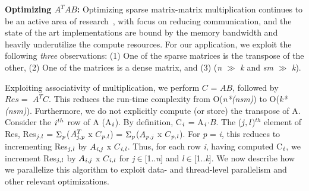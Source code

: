 \vspace*{0.1in} 
{\bf{{ {Optimizing $A^TAB$:}}}}
    Optimizing sparse matrix-matrix  multiplication continues to be an
    active area of research~\cite{ballard13,patwary15}, with focus on
    reducing communication, and the state of the art implementations
    are bound by the memory bandwidth and heavily
    underutilize the compute resources. 
    For our application, we exploit the following {\it{three}} observations:
    (1) One of the sparse matrices is the transpose of the other,   
    (2) One of the matrices is a dense matrix,   and    %
    (3) ({\it{n}} $\gg$  {\it{k}} and  {\it{sm}} $\gg$ {\it{k}}).

    Exploiting associativity of multiplication, we perform $C$ = $AB$, 
    followed by $Res =$ $A^TC$. This reduces the run-time complexity from
    O({\it{n*(nsm)}}) to O({\it{k*(nsm)}}). Furthermore, we do not
    explicitly compute (or store) the transpose of A.  Consider the
    ${\it{i}}^{th}$ row of A (A$_{\it{i}}$). 
    By definition, 
    C$_{\it{i}}$ %
    = A$_{\it{i}}$$\cdot$$B$.
     The (${\it{j}},{\it{l}}$)$^{th}$ element of Res,
    Res$_{{\it{j}},{\it{l}}}$ =
    $\Sigma_{\it{p}}$($A^T_{{\it{j}},{\it{p}}}$ x $C$$_{{\it{p}},{\it{l}}}$) = 
    $\Sigma_{\it{p}}$($A_{{\it{p}},{\it{j}}}$ x
    $C$$_{{\it{p}},{\it{l}}}$).
    For {\it{p}} = {\it{i}}, this reduces to incrementing
    Res$_{{\it{j}},{\it{l}}}$ by $A_{{\it{i}},{\it{j}}}$ x
    $C$$_{{\it{i}},{\it{l}}}$. 
    Thus, for each row {\it{i}}, 
    having computed C$_{\it{i}}$, we
    increment Res$_{{\it{j}},{\it{l}}}$ 
    by $A_{{\it{i}},{\it{j}}}$ x $C$$_{{\it{i}},{\it{l}}}$
    for {\it{j}}$\in$[1..{\it{n}}] and {\it{l}}$\in$[1..{\it{k}}].
     We now describe how we parallelize this algorithm to exploit
     data- and thread-level parallelism and other relevant
     optimizations.





